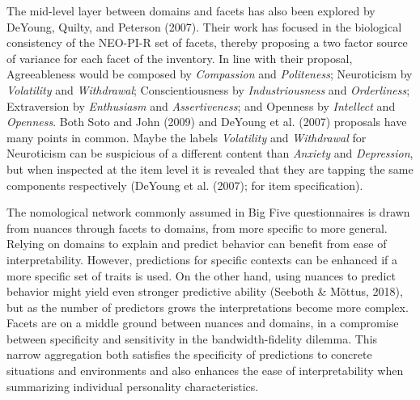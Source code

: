 \documentclass[,man]{apa6}
\theoremstyle{definition}
\theoremstyle{definition}
\theoremstyle{definition}
\theoremstyle{remark}
\begin{document}
The mid-level layer between domains and facets has also been explored by
DeYoung, Quilty, and Peterson (2007). Their work has focused in the
biological consistency of the NEO-PI-R set of facets, thereby proposing
a two factor source of variance for each facet of the inventory. In line
with their proposal, Agreeableness would be composed by
\emph{Compassion} and \emph{Politeness}; Neuroticism by
\emph{Volatility} and \emph{Withdrawal}; Conscientiousness by
\emph{Industriousness} and \emph{Orderliness}; Extraversion by
\emph{Enthusiasm} and \emph{Assertiveness}; and Openness by
\emph{Intellect} and \emph{Openness}. Both Soto and John (2009) and
DeYoung et al. (2007) proposals have many points in common. Maybe the
labels \emph{Volatility} and \emph{Withdrawal} for Neuroticism can be
suspicious of a different content than \emph{Anxiety} and
\emph{Depression}, but when inspected at the item level it is revealed
that they are tapping the same components respectively (DeYoung et al.
(2007); for item specification).

The nomological network commonly assumed in Big Five questionnaires is
drawn from nuances through facets to domains, from more specific to more
general. Relying on domains to explain and predict behavior can benefit
from ease of interpretability. However, predictions for specific
contexts can be enhanced if a more specific set of traits is used. On
the other hand, using nuances to predict behavior might yield even
stronger predictive ability (Seeboth \& Mõttus, 2018), but as the number
of predictors grows the interpretations become more complex. Facets are
on a middle ground between nuances and domains, in a compromise between
specificity and sensitivity in the bandwidth-fidelity dilemma. This
narrow aggregation both satisfies the specificity of predictions to
concrete situations and environments and also enhances the ease of
interpretability when summarizing individual personality
characteristics.
\end{document}
